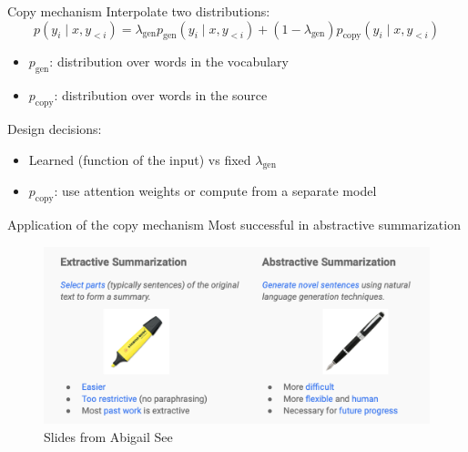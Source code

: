 \documentclass[usenames,dvipsnames,notes]{beamer}
\begin{document}
\begin{frame}
    {Copy mechanism}
    Interpolate two distributions:
    $$
    p(y_i\mid x, y_{<i}) = \lambda_{\text{gen}}p_{\text{gen}}(y_i\mid x, y_{<i})
    + (1 - \lambda_{\text{gen}})p_{\text{copy}}(y_i\mid x, y_{<i})
    $$
    \vspace{-2em}
    \begin{itemize}
        \item $p_{\text{gen}}$: distribution over words in the vocabulary
        \item $p_{\text{copy}}$: distribution over words in the source
    \end{itemize}

    Design decisions:\\
    \begin{itemize}
        \item Learned (function of the input) vs fixed $\lambda_{\text{gen}}$
        \item $p_{\text{copy}}$: use attention weights or compute from a separate model
    \end{itemize}
\end{frame}

\begin{frame}
    {Application of the copy mechanism}
    Most successful in abstractive summarization
    \vspace{-1em}
    \begin{figure}
        \includegraphics[width=12cm]{figures/summarization}
        \caption{Slides from Abigail See}
    \end{figure}
\end{frame}
\end{document}
